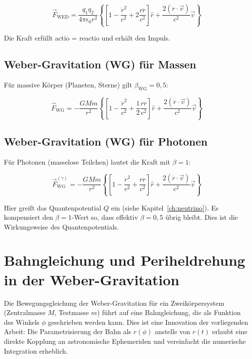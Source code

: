 \[
\vec{F}_{\text{WED}} = \frac{q_1 q_2}{4\pi\epsilon_0 r^2} \left\{ \left[ 1 - \frac{\dot{r}^2}{c^2} + 2 \frac{r\ddot{r}}{c^2} \right] \hat{r} + \frac{2(\dot{r} \cdot \vec{v})}{c^2} \vec{v} \right\}
\]

Die Kraft erfüllt actio = reactio und erhält den Impuls.

\subsection{Weber-Gravitation (WG) für Massen}
\label{sec:weber_wg_massen}

Für massive Körper (Planeten, Sterne) gilt \(\beta_{\text{WG}} = 0,5\):

\[
\vec{F}_{\text{WG}} = -\frac{GMm}{r^2} \left\{ \left[ 1 - \frac{\dot{r}^2}{c^2} + \frac{1}{2} \frac{r\ddot{r}}{c^2} \right] \hat{r} + \frac{2(\dot{r} \cdot \vec{v})}{c^2} \vec{v} \right\}
\]

\subsection{Weber-Gravitation (WG) für Photonen}
\label{sec:weber_wg_photonen}

Für Photonen (masselose Teilchen) lautet die Kraft mit \(\beta = 1\):

\[
\vec{F}_{\text{WG}}^{(\gamma)} = -\frac{GMm}{r^2} \left\{ \left[ 1 - \frac{\dot{r}^2}{c^2} + \frac{r\ddot{r}}{c^2} \right] \hat{r} + \frac{2(\dot{r} \cdot \vec{v})}{c^2} \vec{v} \right\}
\]

Hier greift das Quantenpotential \(Q\) ein (siehe Kapitel~\ref{ch:neutrino}). Es kompensiert den \(\beta = 1\)-Wert so, dass effektiv \(\beta = 0,5\) übrig bleibt. Dies ist die Wirkungsweise des Quantenpotentials.

\section{Bahngleichung und Periheldrehung in der Weber-Gravitation}
\label{sec:weber_bahngleichung}

Die Bewegungsgleichung der Weber-Gravitation für ein Zweikörpersystem (Zentralmasse \(M\), Testmasse \(m\)) führt auf eine Bahngleichung, die als Funktion des Winkels \(\phi\) geschrieben werden kann. Dies ist eine Innovation der vorliegenden Arbeit: Die Parametrisierung der Bahn als \(r(\phi)\) anstelle von \(r(t)\) erlaubt eine direkte Kopplung an astronomische Ephemeriden und vereinfacht die numerische Integration erheblich.

